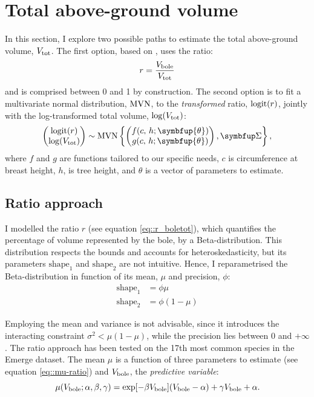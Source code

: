\chapter{Total above-ground volume\label{chap::total_v}}

In this section, I explore two possible paths to estimate the total above-ground volume, \( V_{\text{tot}} \). The first option, based on \cite{Longuetaud2013}, uses the ratio:
\begin{equation}
	r = \frac{V_{\text{bole}}}{V_{\text{tot}}} \label{eq::r_boletot}
\end{equation}
and is comprised between 0 and 1 by construction. The second option is to fit a multivariate normal distribution, \( \operatorname{MVN} \), to the \textit{transformed} ratio, \( \operatorname{logit}(r) \), jointly with the log-transformed total volume, \( \log(V_{\text{tot}}) \):
\begin{equation}
	\begin{pmatrix}
		\logit(r) \\
		\log(\Vtot)
	\end{pmatrix}
	\sim
	\MVN\left\{ \begin{pmatrix}
		f(c, \, h; \symbfup{\theta}) \\
		g(c, \, h; \symbfup{\theta}) \\
	\end{pmatrix}, \Sigmabf \right\},
	\label{eq::mvn}
\end{equation}
where \( f \) and \( g \) are functions tailored to our specific needs, \( c \) is circumference at breast height, \( h \), is tree height, and \( \theta \) is a vector of parameters to estimate.

\section{Ratio approach}

I modelled the ratio \( r \) (see equation \eqref{eq::r_boletot}), which quantifies the percentage of volume represented by the bole, by a Beta-distribution. This distribution respects the bounds and accounts for heteroskedasticity, but its parameters \( \text{shape}_1 \) and \( \text{shape}_2 \) are not intuitive. Hence, I reparametrised the Beta-distribution in function of its mean, \( \mu \) and precision, \( \phi \):
\begin{align*}
	\text{shape}_1 &= \phi \mu \\
	\text{shape}_2 &= \phi (1 - \mu)
\end{align*}

Employing the mean and variance is not advisable, since it introduces the interacting constraint \( \sigma^2 < \mu (1 - \mu) \), while the precision lies between 0 and \( + \infty \). The ratio approach has been tested on the 17\textup{th} most common species in the Emerge dataset. The mean \( \mu \) is a function of three parameters to estimate (see equation \eqref{eq::mu-ratio}) and \( V_{\text{bole}} \), the \textit{predictive variable}:
\begin{equation}
	\mu(V_{\text{bole}}; \alpha, \beta, \gamma) = \exp[-\beta V_{\text{bole}}] (V_{\text{bole}} - \alpha) + \gamma V_{\text{bole}} + \alpha.
	\label{eq::mu-ratio}
\end{equation}

